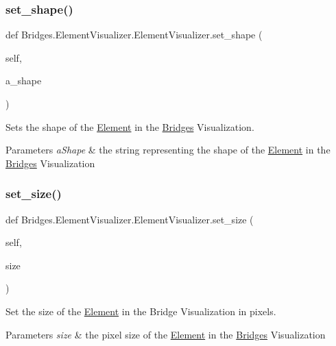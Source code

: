 \subsubsection{\texorpdfstring{set\+\_\+shape()}{set\_shape()}}
{\footnotesize\ttfamily def Bridges.\+Element\+Visualizer.\+Element\+Visualizer.\+set\+\_\+shape (\begin{DoxyParamCaption}\item[{}]{self,  }\item[{}]{a\+\_\+shape }\end{DoxyParamCaption})}



Sets the shape of the \mbox{\hyperlink{namespace_bridges_1_1_element}{Element}} in the \mbox{\hyperlink{namespace_bridges_1_1_bridges}{Bridges}} Visualization. 


\begin{DoxyParams}{Parameters}
{\em a\+Shape} & the string representing the shape of the \mbox{\hyperlink{namespace_bridges_1_1_element}{Element}} in the \mbox{\hyperlink{namespace_bridges_1_1_bridges}{Bridges}} Visualization \\
\hline
\end{DoxyParams}
\mbox{\label{class_bridges_1_1_element_visualizer_1_1_element_visualizer_a7e309ec1893bd855c25d6efaf45711f8}} 
\subsubsection{\texorpdfstring{set\+\_\+size()}{set\_size()}}
{\footnotesize\ttfamily def Bridges.\+Element\+Visualizer.\+Element\+Visualizer.\+set\+\_\+size (\begin{DoxyParamCaption}\item[{}]{self,  }\item[{}]{size }\end{DoxyParamCaption})}



Set the size of the \mbox{\hyperlink{namespace_bridges_1_1_element}{Element}} in the Bridge Visualization in pixels. 


\begin{DoxyParams}{Parameters}
{\em size} & the pixel size of the \mbox{\hyperlink{namespace_bridges_1_1_element}{Element}} in the \mbox{\hyperlink{namespace_bridges_1_1_bridges}{Bridges}} Visualization \\
\hline
\end{DoxyParams}


